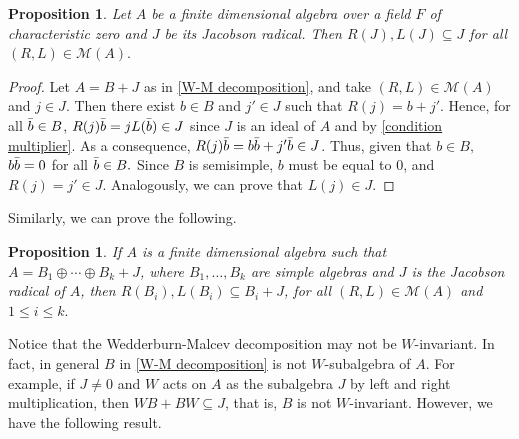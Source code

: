 \documentclass[reqno]{amsart}
\newtheorem{proposition}[theorem]{Proposition}
\theoremstyle{definition}
\numberwithin{equation}{section}
\numberwithin{theorem}{section}
\newcommand{\M}{\mathcal{M}}
\begin{document}
\begin{proposition} \label{pro: multipliers and WM decomposition}
    Let $A$ be a finite dimensional algebra over a field $F$ of characteristic zero and $J$ be its Jacobson radical.
    Then $R(J), L(J)\subseteq J$ for all $(R,L)\in \M(A).$
\end{proposition}
\begin{proof}
   Let $A=B+J$ as in \eqref{W-M decomposition}, and take $(R,L)\in \M(A)$ and $j\in J$. Then there exist $b\in B$ and $j'\in J$ such that $R(j)=b+j'$. Hence, for all $\Bar{b}\in B$, $R(j)\Bar{b}=jL(\Bar{b})\in J$ since $J$ is an ideal of $A$ and by \eqref{condition multiplier}. As a consequence, $R(j)\Bar{b}=b\Bar{b}+j' \Bar{b}\in J$. Thus, given that $b\in B,$ $b \Bar{b}=0$ for all $\Bar{b}\in B.$ Since $B$ is semisimple, $b$ must be equal to $0$, and $R(j)=j'\in J$. Analogously, we can prove that $L(j)\in J$. 
\end{proof}





Similarly, we can prove the following.
\begin{proposition}\label{pro: simple algebras and multipliers}
  If $A$ is a finite dimensional algebra such that $A=B_1 \oplus \cdots \oplus B_k + J$, where $B_1, \ldots, B_k$ are simple algebras and $J$ is the Jacobson radical of $A$, then $R(B_i),L(B_i)\subseteq B_i+J$, for all $(R,L)\in \M(A)$ and $1\leq i \leq k.$
\end{proposition}


Notice that the Wedderburn-Malcev decomposition may not be $W$-invariant. In fact, in general $B$ in \eqref{W-M decomposition} is not $W$-subalgebra of $A.$ For example, if $J\neq 0$ and $W$ acts on $A$ as the subalgebra $J$ by left and right multiplication, then $W B + B  W \subseteq J$, that is, $B$ is not $W$-invariant. However, we have the following result.
\end{document}
